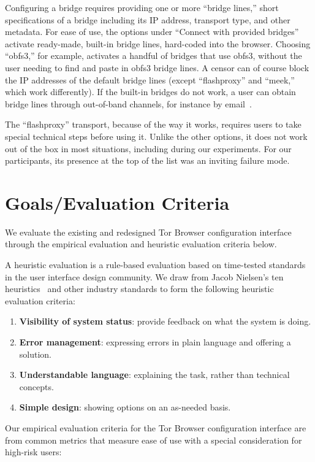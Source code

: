\documentclass[USenglish,oneside,twocolumn]{article}
\begin{document}
Configuring a bridge requires providing one or more
``bridge lines,'' short specifications of a bridge
including its IP address, transport type, and other metadata.
For ease of use, the options under ``Connect with provided bridges''
activate ready-made, built-in bridge lines,
hard-coded into the browser.
Choosing ``obfs3,'' for example, activates a handful
of bridges that use obfs3, without the user needing
to find and paste in obfs3 bridge lines.
A censor can of course block the IP addresses of the default bridge lines
(except ``flashproxy'' and ``meek,'' which work differently).
If the built-in bridges do not work, a user can obtain bridge lines
through out-of-band channels, for instance by email~\cite{bridgedb}.

The ``flashproxy'' transport, because of the way it works,
requires users to take special technical steps before using it.
Unlike the other options, it does not work out of the box
in most situations, including during our experiments.
For our participants, its presence at the top of the list
was an inviting failure mode.

\section{Goals/Evaluation Criteria}
\label{sec:goals}
We evaluate the existing and redesigned Tor Browser configuration interface 
through the empirical evaluation and heuristic evaluation criteria below. 

A heuristic evaluation is a rule-based evaluation based on time-tested standards
in the user interface design community. We draw from Jacob Nielsen's ten heuristics~\cite{nielsen1994heuristic}
and other industry standards to form the following heuristic evaluation criteria: \\

\begin{enumerate}
    \item  {\bfseries Visibility of system status}: provide feedback on what the system is doing. 
    \item  {\bfseries Error management}: expressing errors in plain language and offering a solution. 
    \item  {\bfseries Understandable language}: explaining the task, rather than technical concepts. 
    \item  {\bfseries Simple design}: showing options on an as-needed basis. 
\end{enumerate}

Our empirical evaluation criteria for the Tor Browser configuration
interface are from common metrics that measure ease of use with a special 
consideration for high-risk users: \\
\end{document}
